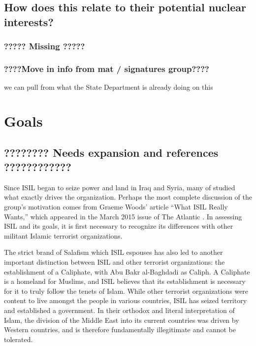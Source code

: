 \documentclass{report}
\begin{document}
\subsection{How does this relate to their potential nuclear interests?}
\subsubsection{????? Missing ?????}
\subsubsection{????Move in info from mat / signatures group????}

we can pull from what the State Department is already doing on this

    
    


\section{Goals}

\subsection{????????  Needs expansion  and references   ????????????}

Since ISIL began to seize power and land in Iraq and Syria, many of studied what exactly drives the organization. Perhaps the most complete discussion of the group's motivation comes from Graeme Woods' article \enquote{What ISIL Really Wants,} which appeared in the March 2015 issue of The Atlantic \cite{Wood2015}. In assessing ISIL and its goals, it is first necessary to recognize its differences with other militant Islamic terrorist organizations. 



The strict brand of Salafism which ISIL espouses has also led to another important distinction between ISIL and other terrorist organizations: the establishment of a Caliphate, with Abu Bakr al-Baghdadi as Caliph. A Caliphate is a homeland for Muslims, and ISIL believes that its establishment is necessary for it to truly follow the tenets of Islam. While other terrorist organizations were content to live amongst the people in various countries, ISIL has seized territory and established a government. In their orthodox and literal interpretation of Islam, the division of the Middle East into its current countries was driven by Western countries, and is therefore fundamentally illegitimate and cannot be tolerated. 
\end{document}
